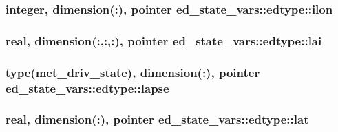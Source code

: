 \subsubsection[{\texorpdfstring{ilon}{ilon}}]{\setlength{\rightskip}{0pt plus 5cm}integer, dimension(\+:), pointer ed\+\_\+state\+\_\+vars\+::edtype\+::ilon}\hypertarget{structed__state__vars_1_1edtype_a22aa678e4fb7e2c15bd468ae05bfb54e}{}\label{structed__state__vars_1_1edtype_a22aa678e4fb7e2c15bd468ae05bfb54e}
\subsubsection[{\texorpdfstring{lai}{lai}}]{\setlength{\rightskip}{0pt plus 5cm}real, dimension(\+:,\+:,\+:), pointer ed\+\_\+state\+\_\+vars\+::edtype\+::lai}\hypertarget{structed__state__vars_1_1edtype_a363af34dbfad6a365d09928d640994dc}{}\label{structed__state__vars_1_1edtype_a363af34dbfad6a365d09928d640994dc}
\subsubsection[{\texorpdfstring{lapse}{lapse}}]{\setlength{\rightskip}{0pt plus 5cm}type({\bf met\+\_\+driv\+\_\+state}), dimension(\+:), pointer ed\+\_\+state\+\_\+vars\+::edtype\+::lapse}\hypertarget{structed__state__vars_1_1edtype_a892e63644a635b6d4d0371bce1412a77}{}\label{structed__state__vars_1_1edtype_a892e63644a635b6d4d0371bce1412a77}
\subsubsection[{\texorpdfstring{lat}{lat}}]{\setlength{\rightskip}{0pt plus 5cm}real, dimension(\+:), pointer ed\+\_\+state\+\_\+vars\+::edtype\+::lat}\hypertarget{structed__state__vars_1_1edtype_a9f58337db4e01b7d2c7e7cb16899add6}{}\label{structed__state__vars_1_1edtype_a9f58337db4e01b7d2c7e7cb16899add6}
